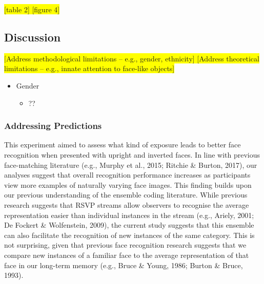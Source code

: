 \documentclass[
  english,
  man]{apa6}
\providecommand{\tightlist}{%
  \setlength{\itemsep}{0pt}\setlength{\parskip}{0pt}}
\begin{document}
\colorbox{yellow}{[table 2]
[figure 4]}

\hypertarget{discussion}{%
\subsection{Discussion}\label{discussion}}

\colorbox{yellow}{[Address methodological limitations – e.g., gender, ethnicity]
[Address theoretical limitations – e.g., innate attention to face-like objects]}

\begin{itemize}
\tightlist
\item
  Gender

  \begin{itemize}
  \tightlist
  \item
    ??
  \end{itemize}
\end{itemize}

\hypertarget{addressing-predictions}{%
\subsubsection{Addressing Predictions}\label{addressing-predictions}}

This experiment aimed to assess what kind of exposure leads to better face recognition when presented with upright and inverted faces. In line with previous face-matching literature (e.g., Murphy et al., 2015; Ritchie \& Burton, 2017), our analyses suggest that overall recognition performance increases as participants view more examples of naturally varying face images. This finding builds upon our previous understanding of the ensemble coding literature. While previous research suggests that RSVP streams allow observers to recognise the average representation easier than individual instances in the stream (e.g., Ariely, 2001; De Fockert \& Wolfenstein, 2009), the current study suggests that this ensemble can also facilitate the recognition of new instances of the same category. This is not surprising, given that previous face recognition research suggests that we compare new instances of a familiar face to the average representation of that face in our long-term memory (e.g., Bruce \& Young, 1986; Burton \& Bruce, 1993).
\end{document}
